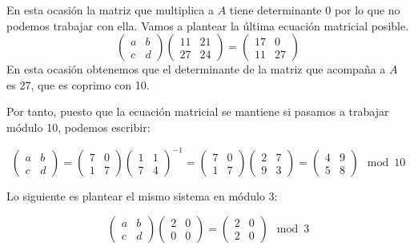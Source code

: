 \begin{problem}[5]
En esta ocasión la matriz que multiplica a $A$ tiene determinante 0 por lo que no podemos trabajar con ella. Vamos a plantear la última ecuación matricial posible.
\[
	\left( \begin{array}{cc}
	a & b \\
	c & d
	\end{array} \right)
	\left( \begin{array}{cc}
	11 & 21\\
	27 & 24
	\end{array} \right)
	=
	\left( \begin{array}{cc}
	17 & 0\\
	11 & 27
	\end{array} \right)
\]
En esta ocasión obtenemos que el determinante de la matriz que acompaña a $A$ es 27, que es coprimo con 10.

Por tanto, puesto que la ecuación matricial se mantiene si pasamos a trabajar módulo 10, podemos escribir:

\[
	\left( \begin{array}{cc}
	a & b \\
	c & d
	\end{array} \right)
	=
	\left( \begin{array}{cc}
	7 & 0\\
	1 & 7
	\end{array} \right) \left( \begin{array}{cc}
	1 & 1\\
	7 & 4
	\end{array} \right)^{-1} = \left( \begin{array}{cc}
	7 & 0\\
	1 & 7
	\end{array} \right) \left( \begin{array}{cc}
	2 & 7\\
	9 & 3
	\end{array} \right) =\left( \begin{array}{cc}
	4 & 9\\
	5 & 8
	\end{array} \right) \mod 10
\]

Lo siguiente es plantear el mismo sistema en módulo 3:

\[
	\left( \begin{array}{cc}
	a & b \\
	c & d
	\end{array} \right)
	\left( \begin{array}{cc}
	2 & 0\\
	0 & 0
	\end{array} \right) = \left( \begin{array}{cc}
	2 & 0\\
	2 & 0
	\end{array} \right) \mod 3
\]


\end{problem}
